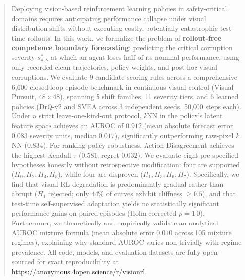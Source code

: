 \begin{abstract}
Deploying vision-based reinforcement learning policies in safety-critical domains requires anticipating performance collapse under visual distribution shifts without executing costly, potentially catastrophic test-time rollouts.
In this work, we formalize the problem of \textbf{rollout-free competence boundary forecasting}: predicting the critical corruption severity $s^*_{\pi,\kappa}$ at which an agent loses half of its nominal performance, using only recorded clean trajectories, policy weights, and post-hoc visual corruptions.
We evaluate 9 candidate scoring rules across a comprehensive 6,600 closed-loop episode benchmark in continuous visual control (Visual Pursuit, $48 \times 48$), spanning 5 shift families, 11 severity tiers, and 6 learned policies (DrQ-v2 and SVEA across 3 independent seeds, 50,000 steps each).
Under a strict leave-one-kind-out protocol, $k$NN in the policy's latent feature space achieves an AUROC of $0.912$ (mean absolute forecast error $0.083$ severity units, median $0.017$), significantly outperforming raw-pixel $k$NN ($0.834$).
For ranking policy robustness, Action Disagreement achieves the highest Kendall $\tau$ ($0.581$, regret $0.032$).
We evaluate eight pre-specified hypotheses honestly without retrospective modification: four are supported ($H_0, H_2, H_4, H_5$), while four are disproven ($H_1, H_3, H_6, H_7$).
Specifically, we find that visual RL degradation is predominantly gradual rather than abrupt ($H_1$ rejected; only $44\%$ of curves exhibit cliffness $\ge 0.5$), and that test-time self-supervised adaptation yields no statistically significant performance gains on paired episodes (Holm-corrected $p = 1.0$).
Furthermore, we theoretically and empirically validate an analytical AUROC mixture formula (mean absolute error $0.010$ across 105 mixture regimes), explaining why standard AUROC varies non-trivially with regime prevalence.
All code, models, and evaluation datasets are fully open-sourced for exact reproducibility at \url{https://anonymous.4open.science/r/visionrl}.
\end{abstract}
